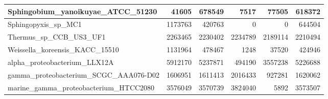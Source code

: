 \documentclass[12pt,a4paper]{article}
\begin{document}
\begin{table}[ht]
\begin{center}
\begin{tabular}{|l*{5}{|r}|}
Sphingobium\_yanoikuyae\_ATCC\_51230 & 41605 & 678549 & 7517 & 77505 & 618372 \\ \hline
Sphingopyxis\_sp\_MC1 & 1173763 & 420763 & 0 & 0 & 644504 \\ \hline
Thermus\_sp\_CCB\_US3\_UF1 & 2263465 & 2230402 & 2234789 & 2189114 & 2210494 \\ \hline
Weissella\_koreensis\_KACC\_15510 & 1131964 & 478467 & 1248 & 37520 & 424946 \\ \hline
alpha\_proteobacterium\_LLX12A & 5912170 & 5237871 & 494190 & 3557238 & 5226688 \\ \hline
gamma\_proteobacterium\_SCGC\_AAA076-D02 & 1606951 & 1611413 & 2016433 & 927281 & 1620062 \\ \hline
marine\_gamma\_proteobacterium\_HTCC2080 & 3576049 & 3570739 & 3824040 & 5892 & 3573507 \\ \hline
\end{tabular}
\end{center}
\end{table}
\end{document}
